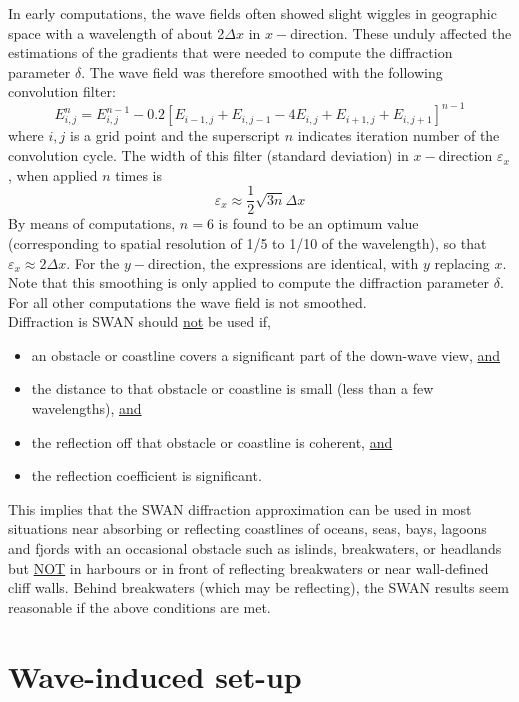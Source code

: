 \documentclass[12pt]{book}
\begin{document}
\noindent
In early computations, the wave fields often showed slight wiggles in geographic space with a wavelength
of about 2$\Delta x$ in $x-$direction. These unduly affected the estimations of the gradients that were
needed to compute the diffraction parameter $\delta$. The wave field was therefore smoothed with the following
convolution filter:
\begin{equation}
  E_{i,j}^n = E_{i,j}^{n-1} - 0.2 [E_{i-1,j}+E_{i,j-1}-4E_{i,j}+E_{i+1,j}+E_{i,j+1}]^{n-1}
\end{equation}
where $i,j$ is a grid point and the superscript $n$ indicates iteration number of the convolution cycle.
The width of this filter (standard deviation) in $x-$direction $\varepsilon_x$, when applied $n$ times is
\begin{equation}
  \varepsilon_x \approx \frac{1}{2} \sqrt{3n} \Delta x
\end{equation}
By means of computations, $n=6$ is found to be an optimum value (corresponding to spatial resolution of
1/5 to 1/10 of the wavelength), so that $\varepsilon_x \approx 2\Delta x$. For the $y-$direction, the expressions
are identical, with $y$ replacing $x$. Note that this smoothing is only applied to compute the diffraction
parameter $\delta$. For all other computations the wave field is not smoothed.
\\[2ex]
\noindent
Diffraction is SWAN should \underline{not} be used if,
\begin{itemize}
  \item an obstacle or coastline covers a significant part of the down-wave view, \underline{and}
  \item the distance to that obstacle or coastline is small (less than a few wavelengths), \underline{and}
  \item the reflection off that obstacle or coastline is coherent, \underline{and}
  \item the reflection coefficient is significant.
\end{itemize}
This implies that the SWAN diffraction approximation can be used in most situations near absorbing or reflecting
coastlines of oceans, seas, bays, lagoons and fjords with an occasional obstacle such as islinds, breakwaters,
or headlands but \underline{NOT} in harbours or in front of reflecting breakwaters or near wall-defined
cliff walls. Behind breakwaters (which may be reflecting), the SWAN results seem reasonable if the above
conditions are met.

\section{Wave-induced set-up} \label{sec:setup}
\end{document}
